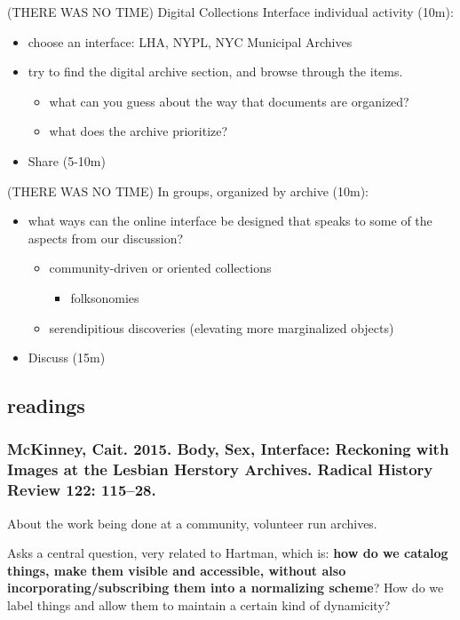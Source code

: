 \documentclass[11pt]{article}
\begin{document}
(THERE WAS NO TIME)
Digital Collections Interface individual activity (10m):
\begin{itemize}
\item choose an interface: LHA, NYPL, NYC Municipal Archives
\item try to find the digital archive section, and browse through the
items. 
\begin{itemize}
\item what can you guess about the way that documents are organized?
\item what does the archive prioritize?
\end{itemize}
\item Share (5-10m)
\end{itemize}

(THERE WAS NO TIME)
In groups, organized by archive (10m):
\begin{itemize}
\item what ways can the online interface be designed that speaks to some
of the aspects from our discussion?
\begin{itemize}
\item community-driven or oriented collections
\begin{itemize}
\item folksonomies
\end{itemize}
\item serendipitious discoveries (elevating more marginalized objects)
\end{itemize}
\item Discuss (15m)
\end{itemize}

\subsection{readings}
\label{sec:orgfdd58bb}
\subsubsection{McKinney, Cait. 2015. Body, Sex, Interface: Reckoning with Images at the Lesbian Herstory Archives. Radical History Review 122: 115–28.}
\label{sec:orgbd83959}
About the work being done at a community, volunteer run archives.

Asks a central question, very related to Hartman, which is: \textbf{how do we
catalog things, make them visible and accessible, without also
incorporating/subscribing them into a normalizing scheme}? How do we
label things and allow them to maintain a certain kind of dynamicity?
\end{document}
